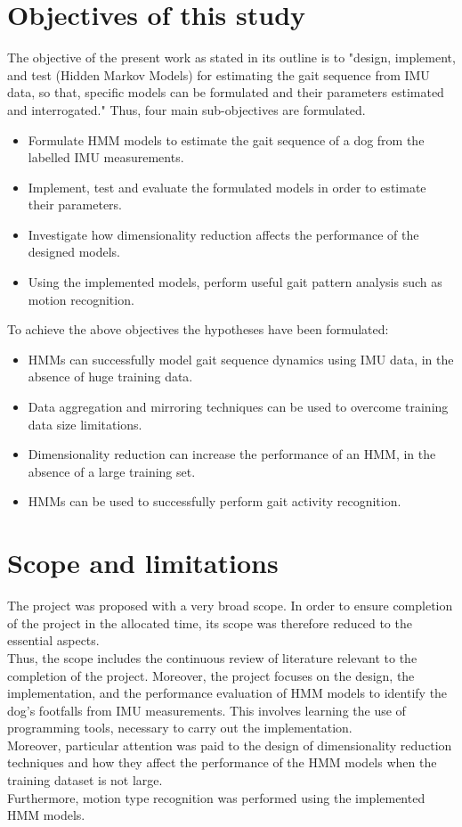 \section{Objectives of this study}
The objective of the present work as stated in its outline is to "design, implement, and test (Hidden Markov Models) for estimating the gait sequence
from IMU data, so that, specific models can be formulated and their
parameters estimated and interrogated." Thus, four main sub-objectives are formulated.
\begin{itemize}
	\item Formulate HMM models to estimate the gait sequence of a dog from the labelled IMU measurements.
	\item Implement, test and evaluate the formulated models in order to estimate their parameters.
	\item Investigate how dimensionality reduction affects the performance of the designed models.
	\item Using the implemented models, perform useful gait pattern analysis such as motion recognition.
\end{itemize}

To achieve the above objectives the hypotheses have been formulated:
\begin{itemize}
	\item HMMs can successfully model gait sequence dynamics using IMU data, in the absence of huge training data.
	\item Data aggregation and mirroring techniques can be used to overcome training data size limitations.
	\item Dimensionality reduction can increase the performance of an HMM, in the absence of a large training set.
	\item HMMs can be used to successfully perform gait activity recognition.
\end{itemize}


\section{Scope and limitations}
The project was proposed with a very broad scope. In order to ensure completion of the project in the allocated time, its scope was therefore reduced to the essential aspects.\\
Thus, the scope includes the continuous review of literature relevant to the completion of the project.
Moreover, the project focuses on the design, the implementation, and the performance evaluation of HMM models to identify the dog's footfalls from IMU measurements. This involves learning the use of programming tools, necessary to carry out the implementation.\\
Moreover, particular attention was paid to the design of dimensionality reduction techniques and how they affect the performance of the HMM models when the training dataset is not large.\\
Furthermore, motion type recognition was performed using the implemented HMM models.
 
